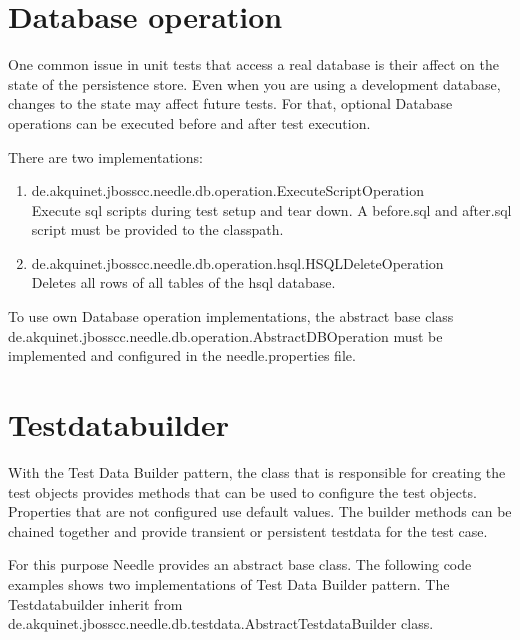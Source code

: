 \section{Database operation}

One common issue in unit tests that access a real database is their affect on the state of the persistence store. Even when you are using a development database, changes to the state may affect future tests. For that, optional Database operations can be executed before and after test execution. 

There are two implementations:
\begin{enumerate}
\item de.akquinet.jbosscc.needle.db.operation.ExecuteScriptOperation \\ Execute sql scripts during test setup and tear down. A before.sql and after.sql script must be provided to the classpath.
\item de.akquinet.jbosscc.needle.db.operation.hsql.HSQLDeleteOperation \\ Deletes all rows of all tables of the hsql database.
\end{enumerate}

To use own Database operation implementations, the abstract base class de.akquinet.jbosscc.needle.db.operation.AbstractDBOperation must be implemented and configured in the needle.properties file.


\section{Testdatabuilder}

With the Test Data Builder pattern, the class that is responsible for creating the test objects provides methods that can be used to configure the test objects. Properties that are not configured use default values. The builder methods can be chained together and provide transient or persistent testdata for the test case.

For this purpose Needle provides an abstract base class. The following code examples shows two implementations of Test Data Builder pattern. The Testdatabuilder inherit from 
de.akquinet.jbosscc.needle.db.testdata.\-AbstractTestdataBuilder class. 


